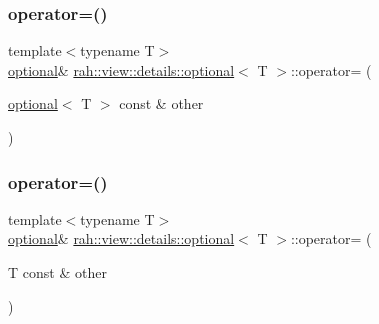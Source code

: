 \mbox{\label{structrah_1_1view_1_1details_1_1optional_a0caa7da5df6580090a3ea0ea25887dfa}} 
\subsubsection{\texorpdfstring{operator=()}{operator=()}\hspace{0.1cm}{\footnotesize\ttfamily [1/2]}}
{\footnotesize\ttfamily template$<$typename T$>$ \\
\mbox{\hyperlink{structrah_1_1view_1_1details_1_1optional}{optional}}\& \mbox{\hyperlink{structrah_1_1view_1_1details_1_1optional}{rah\+::view\+::details\+::optional}}$<$ T $>$\+::operator= (\begin{DoxyParamCaption}\item[{\mbox{\hyperlink{structrah_1_1view_1_1details_1_1optional}{optional}}$<$ T $>$ const \&}]{other }\end{DoxyParamCaption})\hspace{0.3cm}{\ttfamily [inline]}}

\mbox{\label{structrah_1_1view_1_1details_1_1optional_a7e352c56530dfa8c330ac41dae64a270}} 
\subsubsection{\texorpdfstring{operator=()}{operator=()}\hspace{0.1cm}{\footnotesize\ttfamily [2/2]}}
{\footnotesize\ttfamily template$<$typename T$>$ \\
\mbox{\hyperlink{structrah_1_1view_1_1details_1_1optional}{optional}}\& \mbox{\hyperlink{structrah_1_1view_1_1details_1_1optional}{rah\+::view\+::details\+::optional}}$<$ T $>$\+::operator= (\begin{DoxyParamCaption}\item[{T const \&}]{other }\end{DoxyParamCaption})\hspace{0.3cm}{\ttfamily [inline]}}

